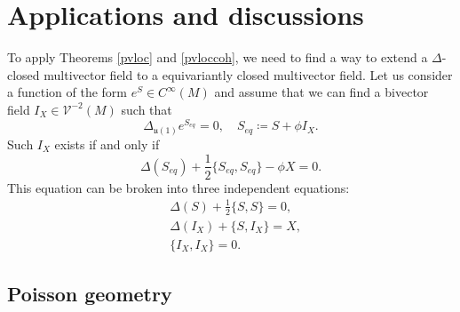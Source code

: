 \documentclass[12pt]{amsart}
\numberwithin{table}{section}
\numberwithin{equation}{section}
\theoremstyle{plain}
\newcommand{\MV}{\mathcal{V}}
\begin{document}
\section{Applications and discussions}

To apply Theorems \ref{pvloc} and \ref{pvloccoh}, we need to find a way to extend a $\Delta$-closed multivector field to a equivariantly closed multivector field. Let us consider a function of the form $e^S \in C^{\infty}(M)$ and assume that we can find a bivector field $I_X \in \MV^{-2}(M)$ such that
\[
\Delta_{\mathfrak{u}(1)} e^{S_{eq}} = 0,
\quad
S_{eq}\coloneqq S + \phi I_X.
\]
Such $I_X$ exists if and only if 
\[
\Delta(S_{eq}) + \frac{1}{2}\{S_{eq}, S_{eq}\} - \phi X = 0.
\]
This equation can be broken into three independent equations:
\begin{align}
	&\Delta(S) + \frac{1}{2}\{S,S\} = 0, \label{eq1}\\
	&\Delta(I_X) + \{S, I_X\} = X, \label{eq2}\\
	&\{I_X, I_X\}=0. \label{eq3}
\end{align}

\subsection{Poisson geometry}
\end{document}
